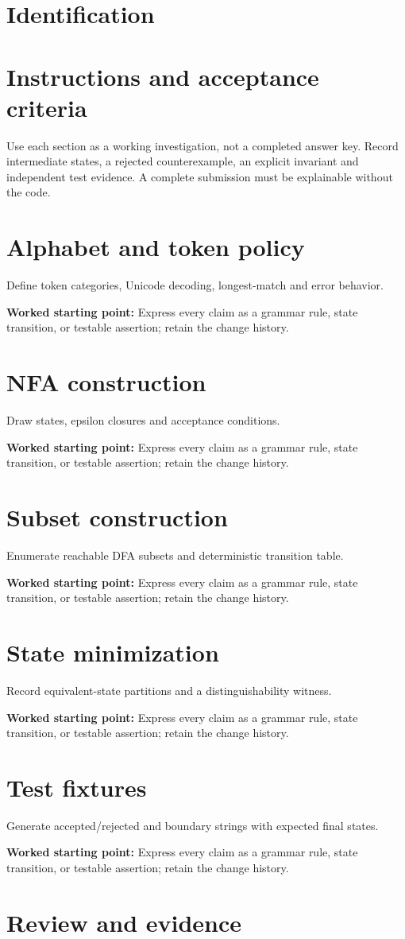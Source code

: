 \documentclass[11pt,letterpaper]{article}
\begin{document}
\makedoctitle\makedocsummary
\tableofcontents\clearpage
\section{Identification}
\section{Instructions and acceptance criteria}
Use each section as a working investigation, not a completed answer key. Record intermediate states, a rejected counterexample, an explicit invariant and independent test evidence. A complete submission must be explainable without the code.
\section{Alphabet and token policy}
Define token categories, Unicode decoding, longest-match and error behavior.\par\textbf{Worked starting point:} Express every claim as a grammar rule, state transition, or testable assertion; retain the change history.
\section{NFA construction}
Draw states, epsilon closures and acceptance conditions.\par\textbf{Worked starting point:} Express every claim as a grammar rule, state transition, or testable assertion; retain the change history.
\section{Subset construction}
Enumerate reachable DFA subsets and deterministic transition table.\par\textbf{Worked starting point:} Express every claim as a grammar rule, state transition, or testable assertion; retain the change history.
\section{State minimization}
Record equivalent-state partitions and a distinguishability witness.\par\textbf{Worked starting point:} Express every claim as a grammar rule, state transition, or testable assertion; retain the change history.
\section{Test fixtures}
Generate accepted/rejected and boundary strings with expected final states.\par\textbf{Worked starting point:} Express every claim as a grammar rule, state transition, or testable assertion; retain the change history.
\section{Review and evidence}
\end{document}

